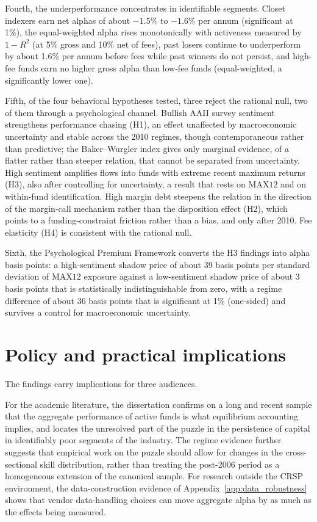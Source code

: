 \documentclass[12pt, oneside]{report}
\begin{document}
Fourth, the underperformance concentrates in identifiable segments.
Closet indexers earn net alphas of about $-1.5\%$ to $-1.6\%$ per annum (significant
at 1\%), the equal-weighted alpha rises monotonically with activeness
measured by $1-R^2$ (at 5\% gross and 10\% net of fees), past losers
continue to underperform by about 1.6\% per annum before fees while past
winners do not persist, and high-fee funds earn no higher gross alpha
than low-fee funds (equal-weighted, a significantly lower one).

Fifth, of the four behavioral hypotheses tested, three reject the
rational null, two of them through a psychological channel. Bullish
AAII survey sentiment strengthens performance chasing (H1), an effect
unaffected by macroeconomic uncertainty and stable across the 2010
regimes, though contemporaneous rather than predictive; the
Baker--Wurgler index gives only marginal evidence, of a flatter rather
than steeper relation, that cannot be separated from uncertainty. High
sentiment amplifies flows into funds with extreme recent maximum returns
(H3), also after controlling for uncertainty, a result that rests on
$\text{MAX12}$ and on within-fund identification. High margin debt
steepens the relation in the direction of the
\textcite{BrunnermeierPedersen2009} margin-call mechanism rather than the
disposition effect (H2), which points to a funding-constraint friction
rather than a bias, and only after 2010. Fee elasticity (H4) is
consistent with the rational null.

Sixth, the Psychological Premium Framework converts the H3 findings into
alpha basis points: a high-sentiment shadow price of about 39 basis
points per standard deviation of $\text{MAX12}$ exposure against a
low-sentiment shadow price of about 3 basis points that is statistically
indistinguishable from zero, with a regime difference of about 36 basis
points that is significant at 1\% (one-sided) and survives a control for
macroeconomic uncertainty.

\section{Policy and practical implications}
\label{sec:implications}

\noindent The findings carry implications for three audiences.

For the academic literature, the dissertation confirms on a long and
recent sample that the aggregate performance of active funds is what
equilibrium accounting implies, and locates the unresolved part of the
puzzle in the persistence of capital in identifiably poor segments of the
industry. The regime evidence further suggests that empirical work on
the puzzle should allow for changes in the cross-sectional skill
distribution, rather than treating the post-2006 period as a homogeneous
extension of the canonical sample. For research outside the CRSP
environment, the data-construction evidence of
Appendix~\ref{app:data_robustness} shows that vendor data-handling
choices can move aggregate alpha by as much as the effects being
measured.
\end{document}

